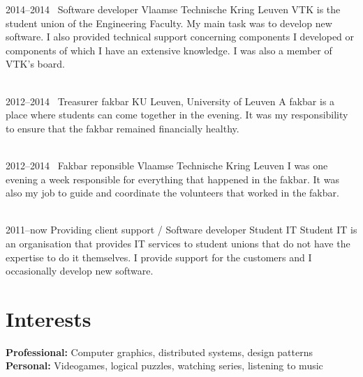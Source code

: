 \documentclass[a4paper]{friggeri-cv} %
\begin{document}
\begin{entrylist}
\entry
{2014--2014~}
{Software developer}
{Vlaamse Technische Kring Leuven}
{VTK is the student union of the Engineering Faculty. My main task was to develop new software. I also provided technical support concerning components I developed or components of which I have an extensive knowledge.
I was also a member of VTK’s board.\\
~}


\entry
{2012--2014~}
{Treasurer fakbar}
{KU Leuven, University of Leuven}
{A fakbar is a place where students can come together in the evening. It was my responsibility to ensure that the fakbar remained financially healthy.\\
~}


\entry
{2012--2014~}
{Fakbar reponsible}
{Vlaamse Technische Kring Leuven}
{I was one evening a week responsible for everything that happened in the fakbar. It was also my job to guide and coordinate the volunteers that worked in the fakbar.\\
~}


\entry
{2011--now}
{Providing client support / Software developer}
{Student IT}
{Student IT is an organisation that provides IT services to student unions that do not have the expertise to do it themselves. I provide support for the customers and I occasionally develop new software.}

\end{entrylist}



\section{Interests}

\textbf{Professional:} Computer graphics, distributed systems, design patterns\\
\textbf{Personal:} Videogames, logical puzzles, watching series, listening to music

\newpage
\addtolength{\oddsidemargin}{-3cm}
\addtolength{\evensidemargin}{-3cm}
\end{document}
